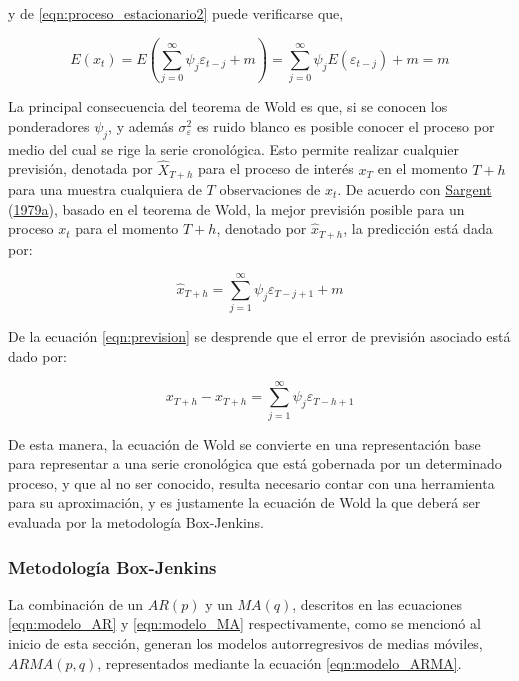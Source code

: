 \documentclass[
]{article}
\begin{document}
y de \eqref{eqn:proceso_estacionario2} puede verificarse que,

\begin{equation}
\label{eqn:dem_proceso_estacionario2}
E(x_t)=E\left(\sum_{j=0}^{\infty} \psi_j\varepsilon_{t-j}+m\right)=\sum_{j=0}^{\infty} \psi_jE\left(\varepsilon_{t-j}\right) + m = m
\end{equation}

La principal consecuencia del teorema de Wold es que, si se conocen los
ponderadores \(\psi_j\), y además \(\sigma_\varepsilon^2\) es ruido
blanco es posible conocer el proceso por medio del cual se rige la serie
cronológica. Esto permite realizar cualquier previsión, denotada por
\(\hat X_{T+h}\) para el proceso de interés \(x_T\) en el momento
\(T+h\) para una muestra cualquiera de \(T\) observaciones de \(x_t\).
De acuerdo con \protect\hyperlink{ref-sargent_macro}{Sargent}
(\protect\hyperlink{ref-sargent_macro}{1979a}), basado en el teorema de
Wold, la mejor previsión posible para un proceso \(x_t\) para el momento
\(T+h\), denotado por \(\hat x_{T+h}\), la predicción está dada por:

\begin{equation}
\label{eqn:prevision}
\hat x_{T+h}=\sum_{j=1}^{\infty} \psi_j \varepsilon_{T-j+1}+m
\end{equation}

De la ecuación \eqref{eqn:prevision} se desprende que el error de
previsión asociado está dado por:

\begin{equation}
\label{eqn:error_prevision}
x_{T+h}- \hat x_{T+h}=\sum_{j=1}^{\infty} \psi_j \varepsilon_{T-h+1}
\end{equation}

De esta manera, la ecuación de Wold se convierte en una representación
base para representar a una serie cronológica que está gobernada por un
determinado proceso, y que al no ser conocido, resulta necesario contar
con una herramienta para su aproximación, y es justamente la ecuación de
Wold la que deberá ser evaluada por la metodología Box-Jenkins.

\subsubsection{Metodología Box-Jenkins}

La combinación de un \(AR(p)\) y un \(MA(q)\), descritos en las
ecuaciones \eqref{eqn:modelo_AR} y \eqref{eqn:modelo_MA}
respectivamente, como se mencionó al inicio de esta sección, generan los
modelos autorregresivos de medias móviles, \(ARMA(p,q)\), representados
mediante la ecuación \eqref{eqn:modelo_ARMA}.
\end{document}
